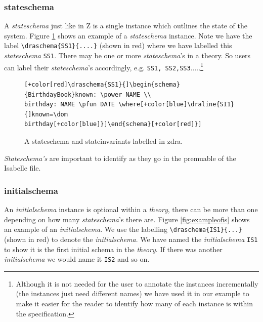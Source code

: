 \subsubsection{stateschema}

A \emph{stateschema} just like in Z is a single instance which outlines the
state of the system. Figure \ref{fig:exampleofss} shows an example of a
\emph{stateschema} instance. Note we have the label \verb|\draschema{SS1}{....}|
(shown in red) where we have labelled this \emph{stateschema} \verb|SS1|. There
may be one or more \emph{stateschema}'s in a theory. So users can label their
\emph{stateschema}'s accordingly, e.g.
\verb|SS1, SS2,SS3|.....\footnote{Although it is not needed for the user to annotate the
instances incrementally (the instances just need different names) we have used
it in our example to make it easier for the reader to identify how many of each instance is within the specification.}

\begin{figure}[H]
\centering
\begin{footnotesize}
\begin{BVerbatim}[commandchars=+\[\]]
[+color[red]\draschema{SS1}{]\begin{schema}{BirthdayBook}known: \power NAME \\
birthday: NAME \pfun DATE \where[+color[blue]\draline{SI1}{]known=\dom
birthday[+color[blue]}]\end{schema}[+color[red]}]
\end{BVerbatim}
\end{footnotesize}
\caption{\label{fig:exampleofss} A stateschema and stateinvariants labelled in \gls{zdra}.}
\end{figure}

\emph{Stateschema's} are important to identify as they go in the premuable of the
Isabelle file.

\subsubsection{initialschema}

An \emph{initialschema} instance is optional within a \emph{theory}, there can
be more than one depending on how many \emph{stateschema}'s there are. Figure
\ref{fig:exampleofis} shows an example of an \emph{initialschema}. We use the
labelling \verb|\draschema{IS1}{...}| (shown in red) to denote the
\emph{initialschema}. We have named the \emph{initialschema} \verb|IS1| to show
it is the first initial schema in the \emph{theory}. If there was another
\emph{initialschema} we would name it \verb|IS2| and so on.

